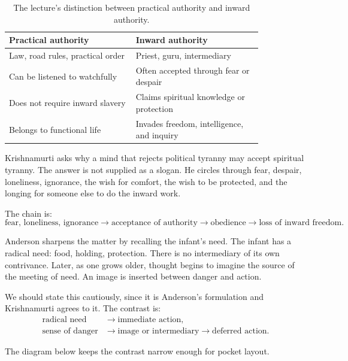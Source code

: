 \begin{table}
\centering
\begin{tabular}{p{0.42\linewidth} p{0.42\linewidth}}
\hline
Practical authority & Inward authority \\
\hline
Law, road rules, practical order & Priest, guru, intermediary \\
Can be listened to watchfully & Often accepted through fear or despair \\
Does not require inward slavery & Claims spiritual knowledge or protection \\
Belongs to functional life & Invades freedom, intelligence, and inquiry \\
\hline
\end{tabular}
\caption{The lecture's distinction between practical authority and inward authority.}
\end{table}

Krishnamurti asks why a mind that rejects political tyranny may accept spiritual tyranny. The answer is not supplied as a slogan. He circles through fear, despair, loneliness, ignorance, the wish for comfort, the wish to be protected, and the longing for someone else to do the inward work.

The chain is:
\begin{equation}
\text{fear, loneliness, ignorance}
\longrightarrow
\text{acceptance of authority}
\longrightarrow
\text{obedience}
\longrightarrow
\text{loss of inward freedom}.
\end{equation}

Anderson sharpens the matter by recalling the infant's need. The infant has a radical need: food, holding, protection. There is no intermediary of its own contrivance. Later, as one grows older, thought begins to imagine the source of the meeting of need. An image is inserted between danger and action.

We should state this cautiously, since it is Anderson's formulation and Krishnamurti agrees to it. The contrast is:
\begin{align}
\text{radical need}
&\longrightarrow
\text{immediate action},\\
\text{sense of danger}
&\longrightarrow
\text{image or intermediary}
\longrightarrow
\text{deferred action}.
\end{align}

The diagram below keeps the contrast narrow enough for pocket layout.

